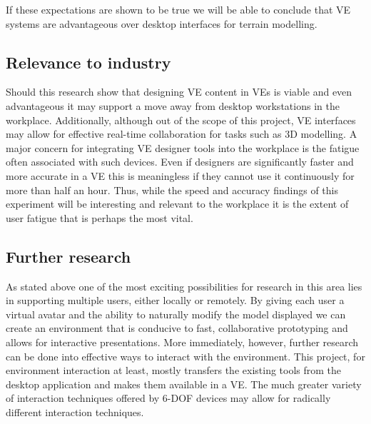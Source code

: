 \documentclass{sig-alternate-05-2015}
\begin{document}
If these expectations are shown to be true we will be able to conclude that VE systems are advantageous over desktop interfaces for terrain modelling. 
\subsection{Relevance to industry}
Should this research show that designing VE content in VEs is viable and even advantageous it may support a move away from desktop workstations in the workplace. Additionally, although out of the scope of this project, VE interfaces may allow for effective real-time collaboration for tasks such as 3D modelling. A major concern for integrating VE designer tools into the workplace is the fatigue often associated with such devices. Even if designers are significantly faster and  more accurate in a VE this is meaningless if they cannot use it continuously for more than half an hour. Thus, while the speed and accuracy findings of this experiment will be interesting and relevant to the workplace it is the extent of user fatigue that is perhaps the most vital.
\newpage
\subsection{Further research}
As stated above one of the most exciting possibilities for research in this area lies in supporting multiple users, either locally or remotely. By giving each user a virtual avatar and the ability to naturally modify the model displayed we can create an environment that is conducive to fast, collaborative prototyping and allows for interactive presentations.
More immediately, however, further research can be done into effective ways to interact with the environment. This project, for environment interaction at least, mostly transfers the existing tools from the desktop application and makes them available in a VE. The much greater variety of interaction techniques offered by 6-DOF devices may allow for radically different interaction techniques.
\newpage


\end{document}
